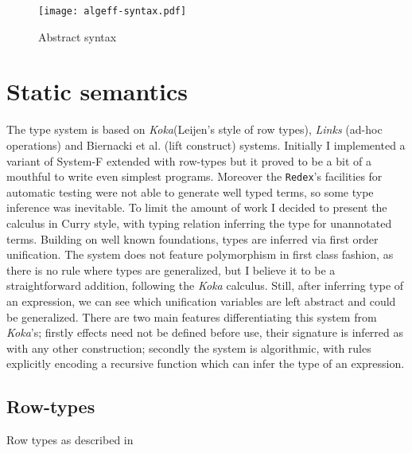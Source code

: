 \documentclass[inz, english, shortabstract]{iithesis}
\begin{document}
\begin{figure}
  \centering
  \texttt{[image: algeff-syntax.pdf]}
  \caption{Abstract syntax}
  \label{fig:algeff-syntax}
\end{figure}

\section{Static semantics}
The type system is based on \emph{Koka}(Leijen's style of row types\cite{Leijen2005}), \emph{Links}\cite{Hillerstrom2016} (ad-hoc operations) and Biernacki et al. \cite{Biernacki2017} (lift construct) systems.
Initially I implemented a variant of System-F extended with row-types but it proved to be a bit of a mouthful to write even simplest programs.
Moreover the \texttt{Redex}'s facilities for automatic testing were not able to generate well typed terms, so some type inference was inevitable.
To limit the amount of work I decided to present the calculus in Curry style, with typing relation inferring the type for unannotated terms.
Building on well known foundations, types are inferred via first order unification.
The system does not feature polymorphism in first class fashion, as there is no rule where types are generalized, but I believe it to be a straightforward addition, following the \emph{Koka}\cite{Leijen2014} calculus.
Still, after inferring type of an expression, we can see which unification variables are left abstract and could be generalized.
There are two main features differentiating this system from \emph{Koka}'s; firstly effects need not be defined before use, their signature is inferred as with any other construction; secondly the system is algorithmic, with rules explicitly encoding a recursive function which can infer the type of an expression.

\subsection{Row-types}
Row types as described in \cite{Leijen2005}
\end{document}
